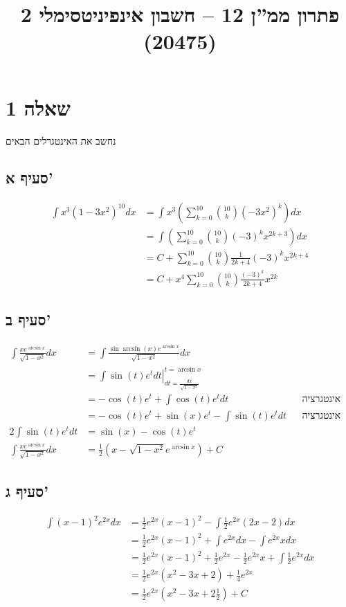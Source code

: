 
\title{פתרון ממ''ן 12 – חשבון אינפיניטסימלי 2 (20475)}


\maketitle
\maketitleprint{}
\section{שאלה 1}
נחשב את האינטגרלים הבאים

\subsection{סעיף א'}
\begin{align*}
	\int x^3{(1 - 3x^2)}^{10} dx
	& = \int x^3 \left( \sum_{k = 0}^{10} \binom{10}{k} {(-3x^2)}^k \right) dx \\
	& = \int \left( \sum_{k = 0}^{10} \binom{10}{k} {(-3)}^k x^{2k + 3} \right) dx \\
	& = C + \sum_{k = 0}^{10} \binom{10}{k} \frac{1}{2k + 4} {(-3)}^k x^{2k + 4} \\
	& = C + x^4 \sum_{k = 0}^{10} \binom{10}{k} \frac{{(-3)}^k}{2k + 4} x^{2k}
\end{align*}

\subsection{סעיף ב'}
\begin{align*}
	\int \frac{x e^{\arcsin x}}{\sqrt{1 - x^2}}dx
	& = \int \frac{\sin \arcsin(x) e^{\arcsin x}}{\sqrt{1 - x^2}}dx \\
	& = \left. \int \sin(t) e^t dt \right|_{dt = \frac{dx}{\sqrt{1 - x^2}}}^{t = \arcsin x} \\
	& = -\cos(t) e^t + \int \cos(t) e^t dt && \text{אינטגרציה בחלקים} \\
	& = -\cos(t) e^t + \sin(x) e^t - \int \sin(t) e^t dt && \text{אינטגרציה בחלקים} \\
	2 \int \sin(t) e^t dt & = \sin(x) - \cos(t) e^t \\
	\int \frac{x e^{\arcsin x}}{\sqrt{1 - x^2}}dx & = \frac{1}{2} \left(x - \sqrt{1 - x^2} e^{\arcsin x}\right) + C
\end{align*}

\subsection{סעיף ג'}
\begin{align*}
	\int {(x - 1)}^2 e^{2x} dx
	& = \frac{1}{2} e^{2x} {(x - 1)}^2 - \int \frac{1}{2} e^{2x} (2x - 2) dx \\
	& = \frac{1}{2} e^{2x} {(x - 1)}^2 + \int e^{2x} dx - \int e^{2x} x dx \\
	& = \frac{1}{2} e^{2x} {(x - 1)}^2 + \frac{1}{2} e^{2x} - \frac{1}{2} e^{2x} x + \int \frac{1}{2} e^{2x} dx \\
	& = \frac{1}{2} e^{2x} (x^2 - 3x + 2) + \frac{1}{4} e^{2x} \\
	& = \frac{1}{2} e^{2x} (x^2 - 3x + 2\frac{1}{2}) + C
\end{align*}

